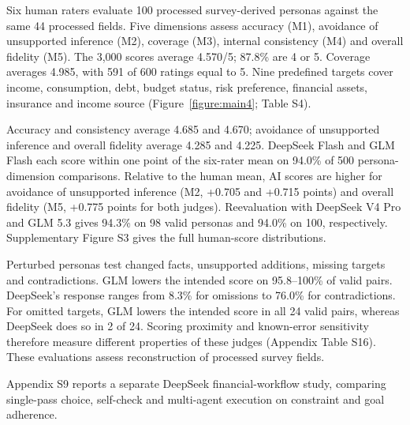 \documentclass[10pt]{article}
\begin{document}
Six human raters evaluate 100 processed survey-derived personas against the same 44 processed fields. Five dimensions assess accuracy (M1), avoidance of unsupported inference (M2), coverage (M3), internal consistency (M4) and overall fidelity (M5). The 3,000 scores average 4.570/5; 87.8\% are 4 or 5. Coverage averages 4.985, with 591 of 600 ratings equal to 5. Nine predefined targets cover income, consumption, debt, budget status, risk preference, financial assets, insurance and income source (Figure~\ref{figure:main4}; Table S4).

Accuracy and consistency average 4.685 and 4.670; avoidance of unsupported inference and overall fidelity average 4.285 and 4.225. DeepSeek Flash and GLM Flash each score within one point of the six-rater mean on 94.0\% of 500 persona-dimension comparisons. Relative to the human mean, AI scores are higher for avoidance of unsupported inference (M2, +0.705 and +0.715 points) and overall fidelity (M5, +0.775 points for both judges). Reevaluation with DeepSeek V4 Pro and GLM 5.3 gives 94.3\% on 98 valid personas and 94.0\% on 100, respectively. Supplementary Figure S3 gives the full human-score distributions.

Perturbed personas test changed facts, unsupported additions, missing targets and contradictions. GLM lowers the intended score on 95.8–100\% of valid pairs. DeepSeek's response ranges from 8.3\% for omissions to 76.0\% for contradictions. For omitted targets, GLM lowers the intended score in all 24 valid pairs, whereas DeepSeek does so in 2 of 24. Scoring proximity and known-error sensitivity therefore measure different properties of these judges (Appendix Table S16). These evaluations assess reconstruction of processed survey fields.

Appendix S9 reports a separate DeepSeek financial-workflow study, comparing single-pass choice, self-check and multi-agent execution on constraint and goal adherence.
\end{document}
